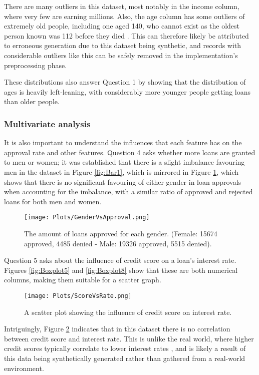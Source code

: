 \para There are many outliers in this dataset, most notably in the income column, where very few are earning millions.
Also, the age column has some outliers of extremely old people, including one aged 140, who cannot exist as the oldest 
person known was 112 before they died \autocite{sky_news_worlds_nodate}. This can therefore likely be attributed 
to erroneous generation due to this dataset being synthetic, and records with considerable outliers like this can 
be safely removed in the implementation's preprocessing phase.

\para These distributions also answer Question 1 by showing that the distribution of ages is heavily left-leaning,
with considerably more younger people getting loans than older people.

\subsubsection{Multivariate analysis}
It is also important to understand the influences that each feature has on the approval rate and other features.
Question 4 asks whether more loans are granted to men or women; it was established that there is a slight imbalance 
favouring men in the dataset in Figure \ref{fig:Bar1}, which is mirrored in Figure \ref{fig:GenderVsApproval}, which 
shows that there is no significant favouring of either gender in loan approvals when accounting for the imbalance, with a similar 
ratio of approved and rejected loans for both men and women.

\begin{figure}[H]
    \centering
    \texttt{[image: Plots/GenderVsApproval.png]}
    \caption{The amount of loans approved for each gender. (Female: 15674 approved, 4485 denied - Male: 19326 approved, 5515 denied).}
    \label{fig:GenderVsApproval}
\end{figure}

\noindent Question 5 asks about the influence of credit score on a loan's interest rate. Figures \ref{fig:Boxplot5} and \ref{fig:Boxplot8}
show that these are both numerical columns, making them suitable for a scatter graph. 

\begin{figure}[H]
    \centering
    \texttt{[image: Plots/ScoreVsRate.png]}
    \caption{A scatter plot showing the influence of credit score on interest rate.}
    \label{fig:ScoreVsRate}
\end{figure}

\para Intriguingly, Figure \ref{fig:ScoreVsRate} indicates that in this dataset there is no correlation between credit score 
and interest rate. This is unlike the real world, where higher credit scores typically correlate to lower interest rates \autocite{american_express_does_nodate},
and is likely a result of this data being synthetically generated rather than gathered from a real-world environment.


